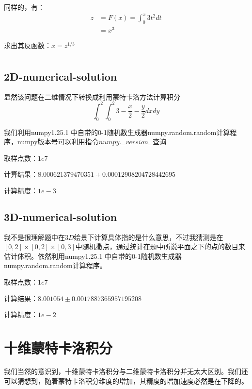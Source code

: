 \documentclass{article}
\begin{document}
	同样的，有：
	\begin{equation*}
		\begin{split}
			z&=F(x)=\int_0^x 3t^2dt\\
			&=x^3
		\end{split}
	\end{equation*}
	
	求出其反函数：$x=z^{1/3}$
	
	\section*{}
	\subsection*{2D-numerical-solution}
	\quad 
	
	显然该问题在二维情况下转换成利用蒙特卡洛方法计算积分
	\begin{equation*}
		\int_0^2\int_0^2 3-\frac{x}{2} - \frac{y}{2}dxdy
	\end{equation*}
	
	我们利用numpy1.25.1 中自带的0-1随机数生成器numpy.random.random计算程序，numpy版本号可以利用指令$numpy.\_\_version\_\_$查询
	
	取样点数：$1e7$
	
	计算结果：$8.000621379470351 \pm 0.00012908204728442695$
	
	计算精度：$1e-3$
	
	\subsection*{3D-numerical-solution}
	\quad 
	
	我不是很理解题中在$3D$绘景下计算具体指的是什么意思，不过我猜测是在$[0,2]\times[0,2]\times[0,3]$中随机撒点，通过统计在题中所说平面之下的点的数目来估计体积。依然利用numpy1.25.1 中自带的0-1随机数生成器numpy.random.random计算程序。
	
	取样点数：$1e7$
	
	计算结果：$8.001054 \pm 0.0017887365957195208$
	
	计算精度：$1e-2$
	
	\section*{十维蒙特卡洛积分}
	\quad 
	
	我们当然的意识到，十维蒙特卡洛积分与二维蒙特卡洛积分并无太大区别。我们还可以猜想到，随着蒙特卡洛积分维度的增加，其精度的增加速度必然是在下降的。
	
\end{document}
